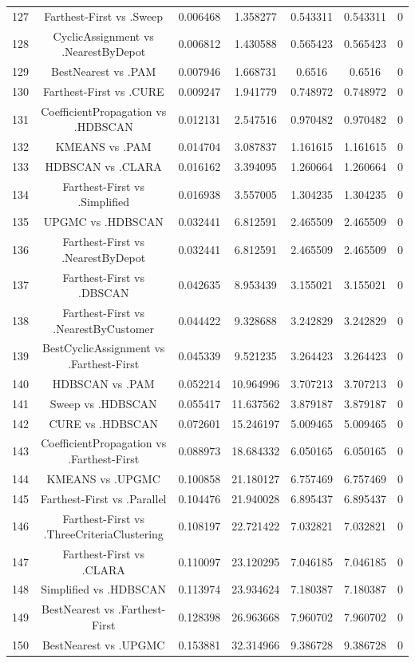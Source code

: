 \documentclass[a4paper,10pt]{article}
\begin{document}
\begin{landscape}
\begin{table}[!htp]
\begin{tabular}{ccccccc}
127&Farthest-First vs .Sweep&0.006468&1.358277&0.543311&0.543311&0\\
128&CyclicAssignment vs .NearestByDepot&0.006812&1.430588&0.565423&0.565423&0\\
129&BestNearest vs .PAM&0.007946&1.668731&0.6516&0.6516&0\\
130&Farthest-First vs .CURE&0.009247&1.941779&0.748972&0.748972&0\\
131&CoefficientPropagation vs .HDBSCAN&0.012131&2.547516&0.970482&0.970482&0\\
132&KMEANS vs .PAM&0.014704&3.087837&1.161615&1.161615&0\\
133&HDBSCAN vs .CLARA&0.016162&3.394095&1.260664&1.260664&0\\
134&Farthest-First vs .Simplified&0.016938&3.557005&1.304235&1.304235&0\\
135&UPGMC vs .HDBSCAN&0.032441&6.812591&2.465509&2.465509&0\\
136&Farthest-First vs .NearestByDepot&0.032441&6.812591&2.465509&2.465509&0\\
137&Farthest-First vs .DBSCAN&0.042635&8.953439&3.155021&3.155021&0\\
138&Farthest-First vs .NearestByCustomer&0.044422&9.328688&3.242829&3.242829&0\\
139&BestCyclicAssignment vs .Farthest-First&0.045339&9.521235&3.264423&3.264423&0\\
140&HDBSCAN vs .PAM&0.052214&10.964996&3.707213&3.707213&0\\
141&Sweep vs .HDBSCAN&0.055417&11.637562&3.879187&3.879187&0\\
142&CURE vs .HDBSCAN&0.072601&15.246197&5.009465&5.009465&0\\
143&CoefficientPropagation vs .Farthest-First&0.088973&18.684332&6.050165&6.050165&0\\
144&KMEANS vs .UPGMC&0.100858&21.180127&6.757469&6.757469&0\\
145&Farthest-First vs .Parallel&0.104476&21.940028&6.895437&6.895437&0\\
146&Farthest-First vs .ThreeCriteriaClustering&0.108197&22.721422&7.032821&7.032821&0\\
147&Farthest-First vs .CLARA&0.110097&23.120295&7.046185&7.046185&0\\
148&Simplified vs .HDBSCAN&0.113974&23.934624&7.180387&7.180387&0\\
149&BestNearest vs .Farthest-First&0.128398&26.963668&7.960702&7.960702&0\\
150&BestNearest vs .UPGMC&0.153881&32.314966&9.386728&9.386728&0\\

\end{tabular}
\end{table}
\end{landscape}
\end{document}
